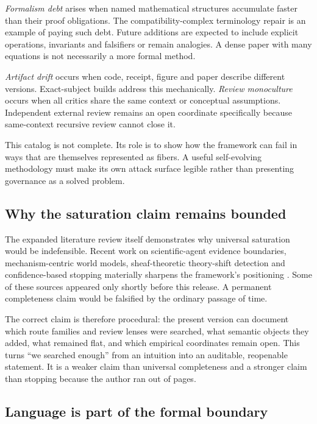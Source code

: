 \emph{Formalism debt} arises when named mathematical structures accumulate faster than their proof obligations. The compatibility-complex terminology repair is an example of paying such debt. Future additions are expected to include explicit operations, invariants and falsifiers or remain analogies. A dense paper with many equations is not necessarily a more formal method.

\emph{Artifact drift} occurs when code, receipt, figure and paper describe different versions. Exact-subject builds address this mechanically. \emph{Review monoculture} occurs when all critics share the same context or conceptual assumptions. Independent external review remains an open coordinate specifically because same-context recursive review cannot close it.

This catalog is not complete. Its role is to show how the framework can fail in ways that are themselves represented as fibers. A useful self-evolving methodology must make its own attack surface legible rather than presenting governance as a solved problem.

\subsection{Why the saturation claim remains bounded}

The expanded literature review itself demonstrates why universal saturation would be indefensible. Recent work on scientific-agent evidence boundaries, mechanism-centric world models, sheaf-theoretic theory-shift detection and confidence-based stopping materially sharpens the framework's positioning \cite{han2026see,posner2026mwm,olivieri2026sheaf,fletcher2026stopping}. Some of these sources appeared only shortly before this release. A permanent completeness claim would be falsified by the ordinary passage of time.

The correct claim is therefore procedural: the present version can document which route families and review lenses were searched, what semantic objects they added, what remained flat, and which empirical coordinates remain open. This turns ``we searched enough'' from an intuition into an auditable, reopenable statement. It is a weaker claim than universal completeness and a stronger claim than stopping because the author ran out of pages.

\subsection{Language is part of the formal boundary}

